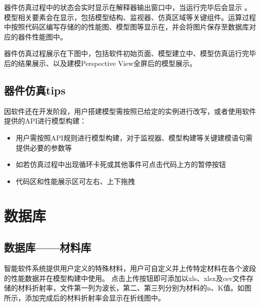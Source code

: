 \documentclass[a4paper,10pt,english]{sphinxmanual}
\begin{document}
{{\sphinxAtStartPar
器件仿真过程中的状态会实时显示在解释器输出窗口中，当运行完毕后会显示 。模型相关要素会在显示，包括模型结构、监视器、仿真区域等关键组件。运算过程中按照代码区编写存储的的性能图、模型图等显示在，并会将图片保存至数据库对应的器件性能图中。

\sphinxAtStartPar
器件仿真过程展示在下图中，包括软件初始页面、模型建立中、模型仿真运行完毕后的结果展示、以及建模Perspective View全屏后的模型展示。


\sphinxAtStartPar
{}






\subsection{器件仿真tips}
\label{\detokenize{_u8f6f_u4ef6_u6a21_u5757_u4ecb_u7ecd/_u5668_u4ef6_u4eff_u771f/contents:tips}}
\sphinxAtStartPar
因软件还在开发阶段，用户搭建模型需按照已给定的实例进行改写，或者使用软件提供的API进行模型构建：
\begin{itemize}
\item {} 
\sphinxAtStartPar
用户需按照API规则进行模型构建，对于监视器、模型构建等关键建模语句需提供必要的参数等

\item {} 
\sphinxAtStartPar
如若仿真过程中出现循环卡死或其他事件可点击代码上方的暂停按钮

\item {} 
\sphinxAtStartPar
代码区和性能展示区可左右、上下拖拽

\end{itemize}

\sphinxstepscope


\section{数据库}
\label{\detokenize{_u8f6f_u4ef6_u6a21_u5757_u4ecb_u7ecd/_u6570_u636e_u5e93/contents:id1}}\label{\detokenize{_u8f6f_u4ef6_u6a21_u5757_u4ecb_u7ecd/_u6570_u636e_u5e93/contents::doc}}

\subsection{数据库——材料库}
\label{\detokenize{_u8f6f_u4ef6_u6a21_u5757_u4ecb_u7ecd/_u6570_u636e_u5e93/contents:id2}}
\sphinxAtStartPar
智能软件系统提供用户定义的特殊材料，用户可自定义并上传特定材料在各个波段的性能数据并在模型构建中使用。
点击上传按钮即可添加以xls、xlsx及csv文件存储的材料折射率，文件第一列为波长，第二、第三列分别为材料的n、K值。如图所示，添加完成后的材料折射率会显示在折线图中。


}}
\end{document}
